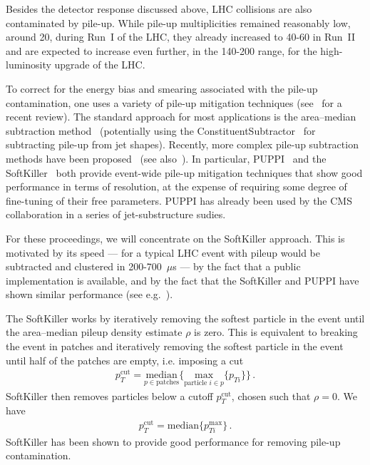 \documentclass[11pt]{cernrep}
\begin{document}
Besides the detector response discussed above, LHC collisions are also
contaminated by pile-up.
%
While pile-up multiplicities remained reasonably low, around 20, during Run~I of
the LHC, they already increased to 40-60 in Run~II and are expected to
increase even further, in the 140-200 range, for the high-luminosity
upgrade of the LHC.

To correct for the energy bias and smearing associated with the
pile-up contamination, one uses a variety of pile-up mitigation
techniques (see~\cite{Soyez:2018opl} for a recent review). The
standard approach for most applications is the area--median
subtraction
method~\cite{Cacciari:2007fd,Cacciari:2008gn,AlcarazMaestre:2012vp,Soyez:2012hv}
(potentially using the ConstituentSubtractor~\cite{Berta:2014eza} for
subtracting pile-up from jet shapes). Recently, more complex pile-up
subtraction methods have been
proposed~\cite{Krohn:2013lba,Bertolini:2014bba,Cacciari:2014gra} (see
also~\cite{Tseng:2013dva,Cacciari:2014jta}). In particular,
PUPPI~\cite{Bertolini:2014bba} and the
SoftKiller~\cite{Cacciari:2014gra} both provide event-wide pile-up
mitigation techniques that show good performance in terms of
resolution, at the expense of requiring some degree of fine-tuning of
their free parameters.
%
PUPPI has already been used by the CMS collaboration in a series of
jet-substructure sudies.

For these proceedings, we will concentrate on the SoftKiller approach.
This is motivated by its speed --- for a typical LHC event with pileup
would be subtracted and clustered in 200-700~$\mu$s --- by the fact
that a public implementation is available, and by the fact that the
SoftKiller and PUPPI have shown similar performance (see e.g.~\cite{puws14}).


The SoftKiller works by iteratively removing the softest particle in
the event until the area--median pileup density estimate $\rho$ is
zero. This is equivalent to breaking the event in patches and
iteratively removing the softest particle in the event until half of
the patches are empty, i.e. imposing a cut
%
\begin{align}
p_T^{\text{cut}}=\underset{p \in \text{patches}}{\text{median}}\Big\{
  \underset{\text{particle }i\in p}{\text{max}}\{ p_{Ti}\}\Big\}\,.
\end{align}
SoftKiller then removes particles below a cutoff $p_T^{\text{cut}}$, chosen such that $\rho=0$. We have
\begin{align}
p_T^{\text{cut}}=\text{median} \{ p_{Ti}^{\text{max}} \}\,.
\end{align}
SoftKiller has been shown to provide good performance for removing pile-up contamination.
\end{document}
